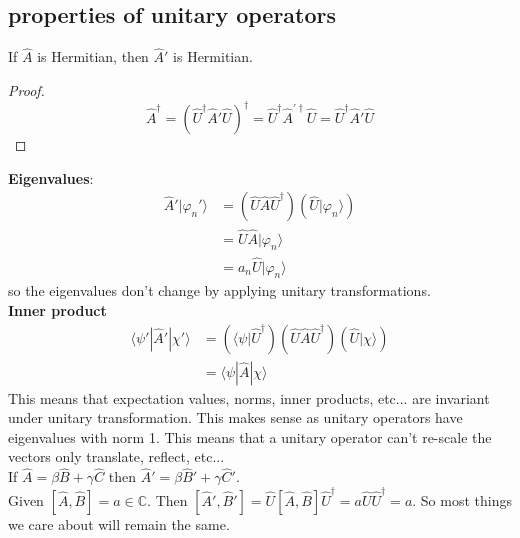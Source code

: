 \documentclass[a4paper, 11pt]{article}
\newcommand{\C}{\mathbb{C}}
\newcommand{\ket}[1]{|#1\rangle}
\newcommand{\bra}[1]{\langle #1 |}
\begin{document}
	\subsection*{properties of unitary operators} 
		\noindent If $\hat{A}$  is Hermitian, then $\hat{A}'$ is Hermitian. \\ 
			\begin{proof}
				$$\hat{A}^\dagger = (\hat{U}^\dagger\hat{A}'\hat{U})^\dagger = \hat{U}^\dagger\hat{A}^{'\dagger}\hat{U} = \hat{U}^\dagger\hat{A}'\hat{U}$$
			\end{proof}
		
		\noindent \textbf{Eigenvalues}:
			\begin{align*}
				\hat{A}'\ket{\varphi_n'} &= (\hat{U}\hat{A}\hat{U}^\dagger)(\hat{U}\ket{\varphi_n}) \\ 
					&= \hat{U}\hat{A}\ket{\varphi_n} \\ 
					&= a_n\hat{U}\ket{\varphi_n} 
			\end{align*}
		so the eigenvalues don't change by applying unitary transformations. \\ 
		
		\noindent \textbf{Inner product}
			\begin{align}
				\bra{\psi'}\hat{A}'\ket{\chi'} &= (\bra{\psi}\hat{U}^\dagger)(\hat{U}\hat{A}\hat{U}^\dagger)(\hat{U}\ket{\chi})\\
				&= \bra{\psi}\hat{A}\ket{\chi}
			\end{align}
		This means that expectation values, norms, inner products, etc... are invariant under unitary transformation. This makes sense as unitary operators have eigenvalues with norm 1. This means that a unitary operator can't re-scale the vectors only translate, reflect, etc...\\ 
		
		\noindent If $\hat{A} = \beta\hat{B}+\gamma\hat{C}$ then $\hat{A}' = \beta\hat{B}'+\gamma\hat{C}'$. \\ 
		
		\noindent Given $[\hat{A}, \hat{B}] = a \in \C$. Then $[\hat{A}', \hat{B}']=\hat{U}[\hat{A},\hat{B}]\hat{U}^\dagger = a\hat{U}\hat{U}^\dagger = a$. So most things we care about will remain the same. 
		
		
		
\end{document}
